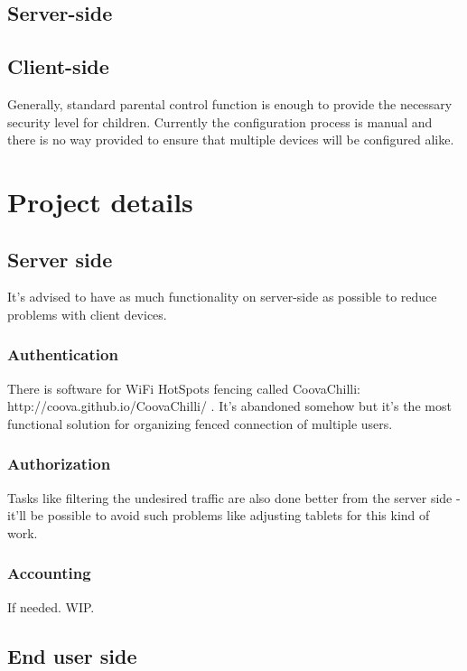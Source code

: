 \documentclass[a4paper]{report}
\begin{document}
\chapter{Server-side}

\chapter{Client-side}

Generally, standard parental control function is enough to provide the
necessary security level for children. Currently the configuration
process is manual and there is no way provided to ensure that multiple
devices will be configured alike.


\part{Project details}

\chapter{Server side}

It's advised to have as much functionality on server-side as possible
to reduce problems with client devices.


\section{Authentication}

There is software for WiFi HotSpots fencing called CoovaChilli:
http://coova.github.io/CoovaChilli/ . It's abandoned somehow but it's
the most functional solution for organizing fenced connection of
multiple users.


\section{Authorization}

Tasks like filtering the undesired traffic are also done better from
the server side - it'll be possible to avoid such problems like
adjusting tablets for this kind of work.


\section{Accounting}

If needed. WIP.


\chapter{End user side}
\end{document}
